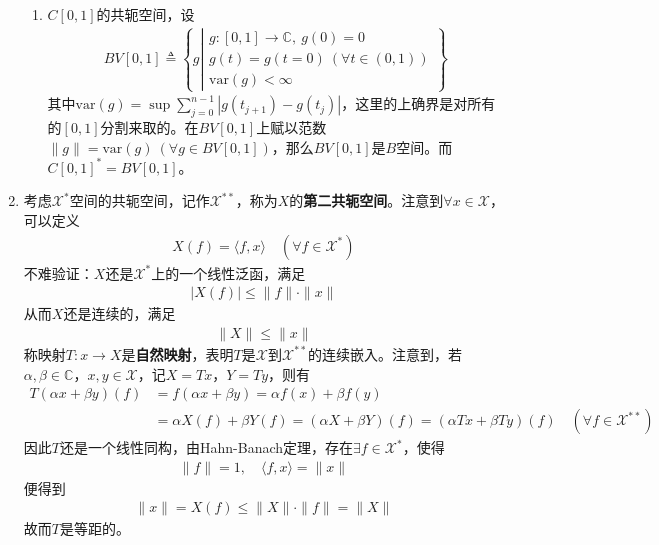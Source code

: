 \begin{enumerate}[leftmargin=2cm, label=\arabic*]
\begin{enumerate}[leftmargin=1cm, label=(\arabic*)]
        \item $C[0,1]$的共轭空间，设
        \begin{align*}
            BV[0,1] \triangleq \left\lbrace g\left|\begin{array}{l}
                g:[0,1]\to\mathbb{C},\ g(0) = 0 \\
                g(t) = g(t=0)\ (\forall t\in(0,1)) \\
                \text{var}(g) < \infty
            \end{array}  \right.\right\rbrace
        \end{align*}
        其中$\text{var}(g) = \sup\sum\limits_{j=0}^{n-1}|g(t_{j+1}) - g(t_j)|$，这里的上确界是对所有的$[0,1]$分割来取的。在$BV[0,1]$上赋以范数$\|g\| = \text{var}(g)\ (\forall g\in BV[0,1])$，那么$BV[0,1]$是$B$空间。而$C[0,1]^* = BV[0,1]$。
    \end{enumerate}
    
    \item 考虑$\mathscr{X}^*$空间的共轭空间，记作$\mathscr{X}^{**}$，称为$X$的\textbf{第二共轭空间}。注意到$\forall x\in \mathscr{X}$，可以定义
        \begin{align*}
            X(f) = \langle f,x\rangle\quad (\forall f\in \mathscr{X}^*)
        \end{align*}
    不难验证：$X$还是$\mathscr{X}^*$上的一个线性泛函，满足
    \begin{align*}
        |X(f)| \leqslant \|f\|\cdot \|x\|
    \end{align*}
    从而$X$还是连续的，满足
    \begin{align*}
        \|X\| \leqslant \|x\|
    \end{align*}
    称映射$T:x\to X$是\textbf{自然映射}，表明$T$是$\mathscr{X}$到$\mathscr{X}^{**}$的连续嵌入。注意到，若$\alpha,\beta\in\mathbb{C}$，$x,y\in\mathscr{X}$，记$X = Tx$，$Y = Ty$，则有
    \begin{align*}
        T(\alpha x+ \beta y)(f) &= f(\alpha x+ \beta y) = \alpha f(x) + \beta f(y) \\
        &= \alpha X(f) + \beta Y(f) = (\alpha X + \beta Y)(f) = (\alpha Tx+ \beta T y)(f)\quad (\forall f\in\mathscr{X}^{**})
    \end{align*}
    因此$T$还是一个线性同构，由Hahn-Banach定理，存在$\exists f\in\mathscr{X}^*$，使得
    \begin{align*}
        \|f\| = 1,\quad \langle f,x\rangle = \|x\|
    \end{align*}
    便得到
    \begin{align*}
        \|x\| = X(f) \leqslant \|X\|\cdot\|f\| = \|X\|
    \end{align*}
    故而$T$是等距的。


\end{enumerate}
